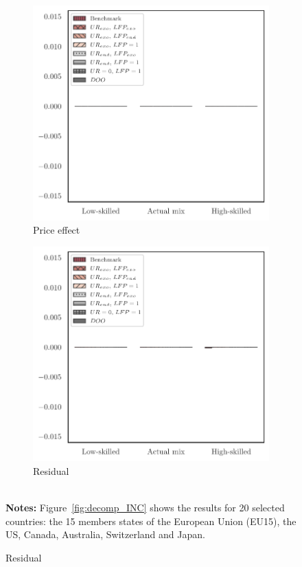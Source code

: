 \documentclass[a4paper,12pt]{article}
\begin{document}
{\begin{landscape}
\begin{center}
\begin{figure}[htb!]
\begin{subfigure}{.3\linewidth}
\end{subfigure}%
\hfill
\begin{subfigure}{.3\linewidth}
  \centering
  \caption{Price effect} \label{fig:decomp_mean_PINC}
  \includegraphics[width=\linewidth]{graphs/qPINC.pdf}
\end{subfigure}
\hfill
\begin{subfigure}{.3\linewidth}
  \centering
  \caption{Residual} \label{fig:decomp_mean_ResnINC}
  \includegraphics[width=\linewidth]{graphs/qResnINC.pdf}
\end{subfigure}
\\[0.5cm]
{\footnotesize \textbf{Notes:} Figure~\ref{fig:decomp_INC} shows the results for 20 selected countries:
the 15 members states of the European Union (EU15), the US, Canada,
Australia, Switzerland and Japan.}
\end{figure}
\end{center}
\end{landscape}\restoregeometry}
\end{document}
